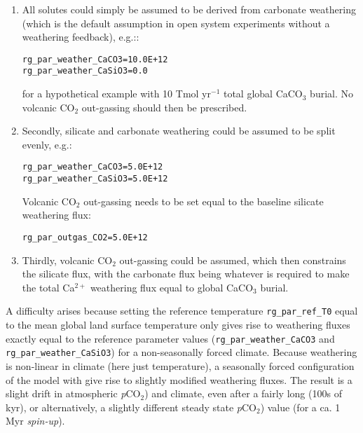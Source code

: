 \documentclass[11pt,fleqn]{book} %
\begin{document}
\begin{enumerate}

\item All solutes could simply be assumed to be derived from carbonate weathering (which is the default assumption in open system experiments without a weathering feedback), e.g.::
\vspace{-1mm}\begin{verbatim}
rg_par_weather_CaCO3=10.0E+12
rg_par_weather_CaSiO3=0.0
\end{verbatim}\vspace{-1mm}
for a hypothetical example with 10 Tmol yr$^{-1}$ total global CaCO$_{3}$ burial. No volcanic CO$_{2}$ out-gassing should then be prescribed.
\item Secondly, silicate and carbonate weathering could be assumed to be split evenly, e.g.:
\vspace{-1mm}\begin{verbatim}
rg_par_weather_CaCO3=5.0E+12
rg_par_weather_CaSiO3=5.0E+12
\end{verbatim}\vspace{-1mm}
Volcanic CO$_{2}$ out-gassing needs to be set equal to the baseline silicate weathering flux:
\vspace{-1mm}\begin{verbatim}
rg_par_outgas_CO2=5.0E+12
\end{verbatim}\vspace{-1mm}
\item Thirdly, volcanic CO$_{2}$ out-gassing could be assumed, which then constrains the silicate flux, with the carbonate flux being whatever is required to make the total Ca$^{2+}$ weathering flux equal to global CaCO$_{3}$ burial.

\end{enumerate}

A difficulty arises because setting the reference temperature \texttt{rg\_par\_ref\_T0} equal to the mean global land surface temperature only gives rise to weathering fluxes exactly equal to the reference parameter values (\texttt{rg\_par\_weather\_CaCO3} and \texttt{rg\_par\_weather\_CaSiO3}) for a non-seasonally forced climate. Because weathering is non-linear in climate (here just temperature), a seasonally forced configuration of the model with give rise to slightly modified weathering fluxes. The result is a slight drift in atmospheric \textit{p}CO${_2}$) and climate, even after a fairly long (100s of kyr), or alternatively, a slightly different steady state \textit{p}CO${_2}$) value (for a ca. 1 Myr \textit{spin-up}).
\end{document}
